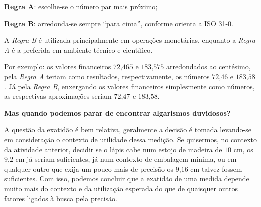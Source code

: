 \textbf{Regra A}: escolhe-se o número par mais próximo;

\textbf{Regra B}: arredonda-se sempre “para cima”, conforme orienta a ISO 31-0.

A \textit{Regra B} é utilizada principalmente em operações monetárias, enquanto a \textit{Regra A} é a preferida em ambiente técnico e científico.

Por exemplo: os valores financeiros \(72\text{,}465\) e \(183\text{,}575\) arredondados ao centésimo, pela \textit{Regra A} teriam como resultados, respectivamente, os números \(72\text{,}46\) e \(183\text{,}58\). Já pela \textit{Regra B}, enxergando os valores financeiros simplesmente como números, as respectivas aproximações seriam \(72\text{,}47\) e \(183\text{,}58\).

\textbf{Mas quando podemos parar de encontrar algarismos duvidosos?}

A questão da exatidão é bem relativa, geralmente a decisão é tomada levando-se em consideração o contexto de utilidade dessa medição. Se quisermos, no contexto da atividade anterior, decidir se o lápis cabe num estojo de madeira de \(10\) cm, os \(9\text{,}2\) cm já seriam suficientes, já num contexto de embalagem mínima, ou em qualquer outro que exija um pouco mais de precisão os \(9\text{,}16\) cm talvez fossem suficientes. Com isso, podemos concluir que a exatidão de uma medida depende muito mais do contexto e da utilização esperada do que de quaisquer outros fatores ligados à busca pela precisão.

